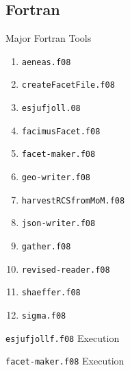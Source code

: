 % 

\subsection{Fortran}
\begin{frame}[ allowframebreaks ]{Major Fortran Tools}
\begin{enumerate}
	\item \texttt{aeneas.f08}
	\item \texttt{createFacetFile.f08}
	\item \texttt{esjufjoll.08}
	\item \texttt{facimusFacet.f08}
	\item \texttt{facet-maker.f08}
	\item \texttt{geo-writer.f08}
	\item \texttt{harvestRCSfromMoM.f08}
	\item \texttt{json-writer.f08}
	\item \texttt{gather.f08}
	\item \texttt{revised-reader.f08}
	\item \texttt{shaeffer.f08}
	\item \texttt{sigma.f08}
\end{enumerate}
\end{frame}

\begin{frame}{\texttt{esjufjollf.f08} Execution}
\scriptsize

\end{frame}

\begin{frame}{\texttt{facet-maker.f08} Execution}
\scriptsize

\end{frame}

